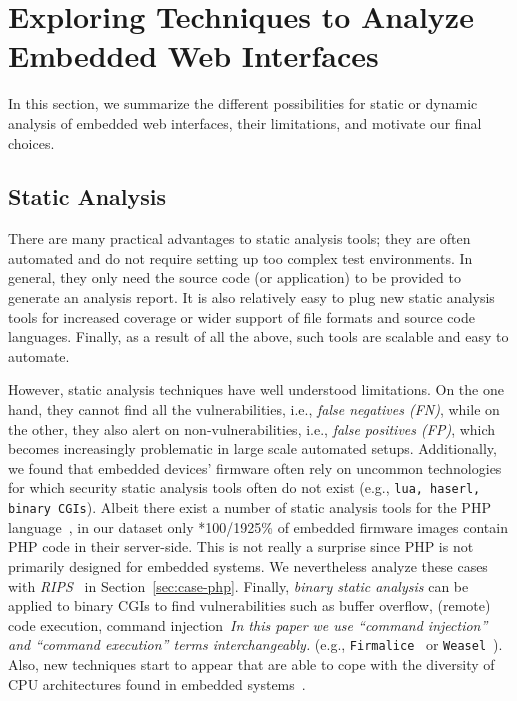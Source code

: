 \documentclass[conference]{./templates/ndss/IEEEtran}
\newcounter{t0d0_counter}
\newcounter{pr00f_counter}
\newcommand\printpercent[2]{\the\numexpr#1*100/#2\%}
\newcommand{\countfirmwarewebTP}{1925}
\newcommand{\CountFirmwarePhp}{150}
\begin{document}
\section{Exploring Techniques to Analyze Embedded Web Interfaces}
\label{sec:opti-stat-dynam}

In this section, we summarize the different possibilities for static
or dynamic analysis of embedded web interfaces, their limitations, and 
motivate our final choices.

\subsection{Static Analysis}
\label{sec:static-analysis}






There are many practical advantages to static analysis tools; they are
often automated and do not require setting up too complex test
environments.  In general, they only need the source code (or
application) to be provided to generate an analysis
report.  It is also relatively easy to plug new static analysis tools
for increased coverage or wider support of file formats and source
code languages.  Finally, as a result of all the above, such tools are
scalable and easy to automate.




However, static analysis techniques have well understood limitations.  On the
one hand, they cannot find all the vulnerabilities, 
i.e., \emph{false negatives (FN)}, while
on the other, they also alert on non-vulnerabilities, 
i.e., \emph{false positives (FP)}, 
which becomes increasingly problematic in large scale automated setups. 
Additionally, we found that embedded devices' firmware often rely on
uncommon technologies for which security static analysis tools often
do not exist (e.g., \texttt{lua, haserl, binary CGIs}).
Albeit there exist a number of static analysis tools for the 
PHP language~\cite{jovanovic2006pixy, Dahse:rips:ndss14},
in our dataset only \printpercent{\CountFirmwarePhp}{\countfirmwarewebTP} of embedded firmware images 
contain PHP code in their server-side. This is not really
a surprise since PHP is not primarily designed for embedded systems. We
nevertheless analyze these cases with
\emph{RIPS}~\cite{Dahse:rips:ndss14} in Section~\ref{sec:case-php}.
Finally, \emph{binary static analysis} can be applied to binary
CGIs to find vulnerabilities such as buffer overflow, (remote) code execution,
command injection~\emph{In this paper we use ``command injection'' and ``command execution'' terms interchangeably.}
(e.g., \texttt{Firmalice}~\cite{firmalice2015ndss} or \texttt{Weasel}~\cite{Schuster_CCS13}). Also, new techniques start 
to appear that are able to cope with the diversity of CPU architectures found in 
embedded systems~\cite{CrossArchBugSearch2015}.
\end{document}
